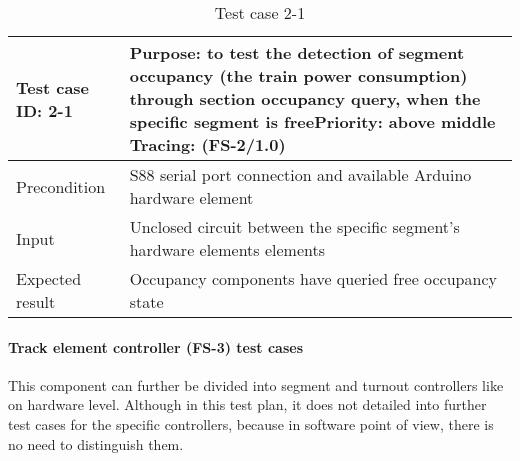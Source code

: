 \begin{table}[H]
	\caption{Test case 2-1}
	\label{table:TCase-FS2-01}
	\begin{center}
		\renewcommand{\arraystretch}{1.8}
		\begin{tabu} 
			to 0.9 \textwidth
			{  X[0.3, l] X[l] }
			\toprule
			Test case ID: 2-1 & Purpose: to test the detection of segment occupancy (the train power consumption) through section occupancy query, when the specific segment is free\newline Priority: above middle \newline Tracing: (FS-2/1.0) \\ \midrule
			Precondition      & S88 serial port connection and available Arduino hardware element                                                                                                                                                \\
			Input             & Unclosed circuit between the specific segment's hardware elements elements                                                                                                                                       \\
			Expected result   & Occupancy components have queried free occupancy state                                                                                                                                                           \\ \bottomrule
		\end{tabu}
	\end{center}
\end{table} 

\paragraph{Track element controller (FS-3)  test cases} This component can further be divided into segment and turnout controllers like on hardware level. Although in this test plan, it does not detailed into further test cases for the specific controllers, because in software point of view, there is no need to distinguish them.

